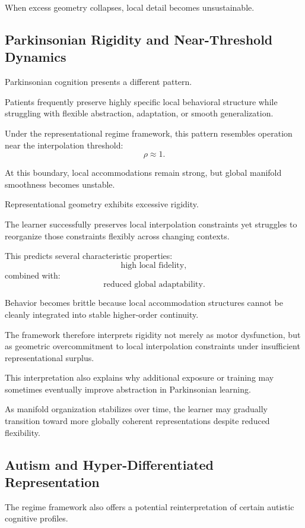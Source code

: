 \documentclass[12pt,a4paper]{article}
\begin{document}
When excess geometry collapses, local detail becomes unsustainable.

\subsection{Parkinsonian Rigidity and Near-Threshold Dynamics}

Parkinsonian cognition presents a different pattern.

Patients frequently preserve highly specific local behavioral structure while struggling with flexible abstraction, adaptation, or smooth generalization.

Under the representational regime framework, this pattern resembles operation near the interpolation threshold:
\[
\rho
\approx
1.
\]

At this boundary, local accommodations remain strong, but global manifold smoothness becomes unstable.

Representational geometry exhibits excessive rigidity.

The learner successfully preserves local interpolation constraints yet struggles to reorganize those constraints flexibly across changing contexts.

This predicts several characteristic properties:
\[
\text{high local fidelity},
\]
combined with:
\[
\text{reduced global adaptability}.
\]

Behavior becomes brittle because local accommodation structures cannot be cleanly integrated into stable higher-order continuity.

The framework therefore interprets rigidity not merely as motor dysfunction, but as geometric overcommitment to local interpolation constraints under insufficient representational surplus.

This interpretation also explains why additional exposure or training may sometimes eventually improve abstraction in Parkinsonian learning.

As manifold organization stabilizes over time, the learner may gradually transition toward more globally coherent representations despite reduced flexibility.

\subsection{Autism and Hyper-Differentiated Representation}

The regime framework also offers a potential reinterpretation of certain autistic cognitive profiles.
\end{document}
